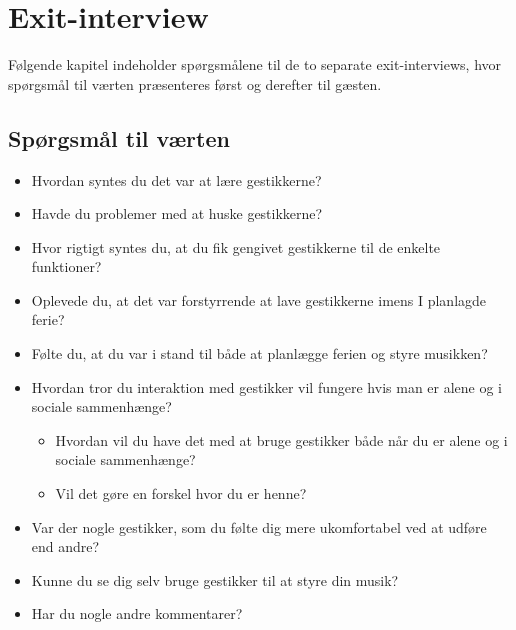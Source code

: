 \chapter{Exit-interview}
\label{app:ExitInterviewSocialAccept}
%
Følgende kapitel indeholder spørgsmålene til de to separate exit-interviews, hvor spørgsmål til værten præsenteres først og derefter til gæsten. \blankline
%
\section{Spørgsmål til værten}
\label{app:ExitInterviewVaert}
%
\begin{itemize}
  \item Hvordan syntes du det var at lære gestikkerne?
  \item Havde du problemer med at huske gestikkerne?
  \item Hvor rigtigt syntes du, at du fik gengivet gestikkerne til de enkelte funktioner? 
  \item Oplevede du, at det var forstyrrende at lave gestikkerne imens I planlagde ferie? 
  \item Følte du, at du var i stand til både at planlægge ferien og styre musikken?
  \item Hvordan tror du interaktion med gestikker vil fungere hvis man er alene og i sociale sammenhænge?
  \begin{itemize}
  	\item Hvordan vil du have det med at bruge gestikker både når du er alene og i sociale sammenhænge?
  	\item Vil det gøre en forskel hvor du er henne?
  \end{itemize}  
  \item Var der nogle gestikker, som du følte dig mere ukomfortabel ved at udføre end andre? 
  \item Kunne du se dig selv bruge gestikker til at styre din musik? 
  \item Har du nogle andre kommentarer? 
\end{itemize}
%
